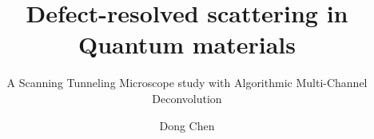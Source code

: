 \documentclass[balanced,twoside,11pt]{ubcdiss}
\title{Defect-resolved scattering in Quantum materials}
\subtitle{A Scanning Tunneling Microscope study with Algorithmic Multi-Channel Deconvolution}
\author{Dong Chen}
\begin{document}
		
		
		\maketitle
		
		\makecommitteepage
		
		
		\cleardoublepage
		
		
		\cleardoublepage
		
		
		\cleardoublepage
		
		\tableofcontents
		\cleardoublepage	%
		
		\listoftables
		\cleardoublepage	%
		
		\listoffigures
		\cleardoublepage	%
		
		
		
		\textspacing		%
		
		
		
		
		\mainmatter
		
		\acresetall	%
		
		
		
\end{document}
